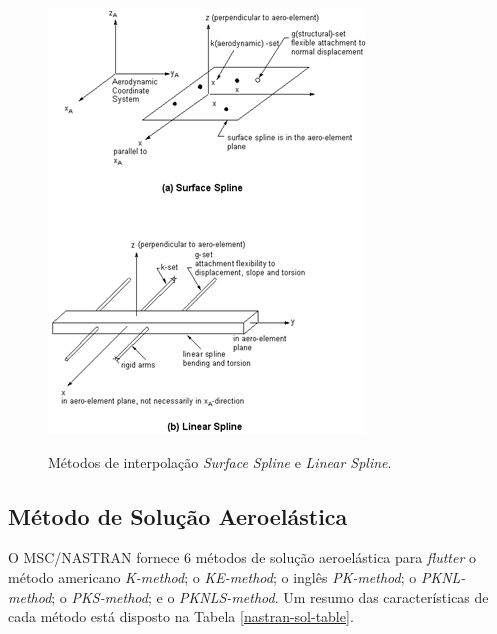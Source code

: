 \begin{figure}[H]
\centering
\caption{Métodos de interpolação \emph{Surface Spline} e \emph{Linear Spline}.}
\includegraphics[width=0.6\linewidth]{figures/splines.png}
\label{fig-splines}
\end{figure}

\subsection{Método de Solução Aeroelástica}

O MSC/NASTRAN fornece 6 métodos de solução aeroelástica para \emph{flutter}
o método americano \emph{K-method}; o \emph{KE-method}; o inglês \emph{PK-method}; o \emph{PKNL-method}; o \emph{PKS-method}; e o \emph{PKNLS-method}. Um resumo das características de cada método
está disposto na Tabela \ref{nastran-sol-table}.


